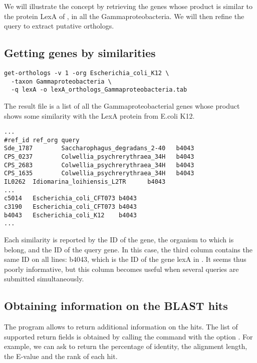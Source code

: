 We will illustrate the concept by retrieving the genes whose product
is similar to the protein LexA of , in
all the Gammaproteobacteria. We will then refine the query to extract
putative orthologs.

\subsection{Getting genes by similarities}

\begin{small}
\begin{verbatim}
get-orthologs -v 1 -org Escherichia_coli_K12 \
  -taxon Gammaproteobacteria \
  -q lexA -o lexA_orthologs_Gammaproteobacteria.tab
\end{verbatim}
\end{small}

The result file is a list of all the Gammaproteobacterial genes whose
product shows some similarity with the LexA protein from E.coli K12.  

\begin{scriptsize}
\begin{verbatim}
...
#ref_id ref_org query
Sde_1787        Saccharophagus_degradans_2-40   b4043
CPS_0237        Colwellia_psychrerythraea_34H   b4043
CPS_2683        Colwellia_psychrerythraea_34H   b4043
CPS_1635        Colwellia_psychrerythraea_34H   b4043
IL0262  Idiomarina_loihiensis_L2TR      b4043
...
c5014   Escherichia_coli_CFT073 b4043
c3190   Escherichia_coli_CFT073 b4043
b4043   Escherichia_coli_K12    b4043
...
\end{verbatim}
\end{scriptsize}

Each similarity is reported by the ID of the gene, the organism to
which is belong, and the ID of the query gene. In this case, the third
column contains the same ID on all lines: b4043, which is the ID of
the gene lexA in \org{Escherichia coli K12}. It seems thus poorly
informative, but this column becomes useful when several queries are
submitted simultaneously.

\subsection{Obtaining information on the BLAST hits}

The program  allows to return additional
information on the hits. The list of supported return fields is
obtained by calling the command with the option \option{-help}. For
example, we can ask to return the percentage of identity, the
alignment length, the E-value and the rank of each hit.

